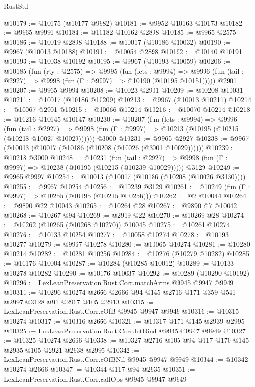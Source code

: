 \begin{lexlean}{RustStd}
\begin{coremodule}
@10179 := @10175 (@10177 @9982)
@10181 := @9952 @10163 @10173
@10182 := @9965 @9991
@10184 := @10182 @10162 @2898
@10185 := @9965 @2575
@10186 := @10019 @2898
@10188 := @10017 (@10186 @10032)
@10190 := @9967 (@10013 @10188)
@10191 := @10054 @2898
@10192 := @10140 @10191
@10193 := @10038 @10192
@10195 := @9967 (@10193 @10059)
@10206 := @10185
    (fun (rty : @2575) =>
    @9995
      (fun (lets : @9994) =>
      @9996 (fun (tail : @2927) => @9998 (fun (Γ : @9997) => @10190 (@10195 @10151)))))
    @2901
@10207 := @9965 @9994
@10208 := @10023 @2901
@10209 := @10208 @10031
@10211 := @10017 (@10186 @10209)
@10213 := @9967 (@10013 @10211)
@10214 := @10067 @2901
@10215 := @10066 @10214
@10216 := @10070 @10214
@10218 := @10216 @10145 @10147
@10230 := @10207
    (fun (lets : @9994) =>
    @9996
      (fun (tail : @2927) =>
      @9998 (fun (Γ : @9997) => @10213 (@10195 (@10215 (@10218 @10027 @10029))))))
    @3000
@10231 := @9965 @2927
@10238 := @9967 (@10013 (@10017 (@10186 (@10208 (@10026 (@3001 @10029))))))
@10239 := @10218 @3000
@10248 := @10231
    (fun (tail : @2927) => @9998 (fun (Γ : @9997) => @10238 (@10195 (@10215 (@10239 @10029)))))
    @3129
@10249 := @9965 @9997
@10254 := @10013 (@10017 (@10186 (@10208 (@10026 @3130))))
@10255 := @9967 @10254
@10256 := @10239 @3129
@10261 := @10249 (fun (Γ : @9997) => @10255 (@10195 (@10215 @10256)))
@10262 := @2 @10044
@10264 := @9890 @22 @10043
@10265 := @10264 @28
@10267 := @9890 @7 @10042
@10268 := @10267 @94
@10269 := @2919 @22
@10270 := @10269 @28
@10274 := @10262 (@10265 (@10268 @10270)) @10045
@10275 := @10261 @10274
@10276 := @10133 @10254
@10277 := @10058 @10274
@10278 := @10193 @10277
@10279 := @9967 @10278
@10280 := @10065 @10274
@10281 := @10280 @10214
@10282 := @10281 @10256
@10284 := @10276 (@10279 @10282)
@10285 := @10176 @10004
@10287 := @10284 (@10285 @10012)
@10289 := @10133 @10278 @10282
@10290 := @10176 @10037
@10292 := @10289 (@10290 @10192)
@10296 := LexLeanPreservation.Rust.Corr.matchArms @9945 @9947 @9949
@10311 := @10296 @10274 @2666 @2666 @94 @145 @2716 @171 @359 @541 @2997 @3128 @91 @2907 @105 @2913
@10315 := LexLeanPreservation.Rust.Corr.eOfB @9945 @9947 @9949
@10316 := @10315 @10274
@10317 := @10316 @2666
@10321 := @10317 @171 @145 @2939 @2995
@10325 := LexLeanPreservation.Rust.Corr.letBind @9945 @9947 @9949
@10327 := @10325 @10274 @2666
@10338 := @10327 @2716 @105 @94 @117 @170 @145 @2935 @105 @2921 @2938 @2995
@10342 := LexLeanPreservation.Rust.Corr.eOfBNil @9945 @9947 @9949
@10344 := @10342 @10274 @2666
@10347 := @10344 @117 @94 @2935
@10351 := LexLeanPreservation.Rust.Corr.callOps @9945 @9947 @9949

\end{coremodule}
\end{lexlean}
